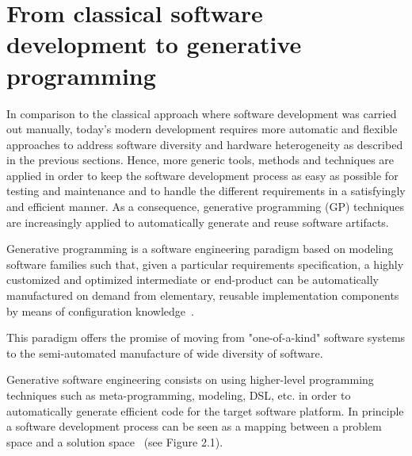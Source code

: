  










\section{From classical software development to generative programming}
\label{sec:FROM} 
In comparison to the classical approach where software development was carried out manually, today’s modern development requires more automatic and flexible approaches to address software diversity and hardware heterogeneity as described in the previous sections.
Hence, more generic tools, methods and techniques are applied in order to keep the software development process as easy as possible for testing and maintenance and to handle the different requirements in a satisfyingly and efficient manner.
As a consequence, generative programming (GP) techniques are increasingly applied to automatically generate and reuse software artifacts.
\begin{mydef}
		Generative programming is a software engineering paradigm based on modeling software families such that, given a particular requirements specification, a highly customized and optimized intermediate or end-product can be automatically manufactured on demand from elementary, reusable implementation components by means of configuration knowledge~\cite{Czarnecki:2000:GPM:345203}.
\end{mydef}

This paradigm offers the promise of moving from "one-of-a-kind" software systems to the semi-automated manufacture of wide diversity of software.

Generative software engineering consists on using higher-level programming techniques such as meta-programming, modeling, DSL, etc. in order to automatically generate efficient code for the target software platform. 
In principle a software development process can be seen as a mapping between a problem space and a solution space~\cite{czarnecki2005overview} (see Figure 2.1). 

